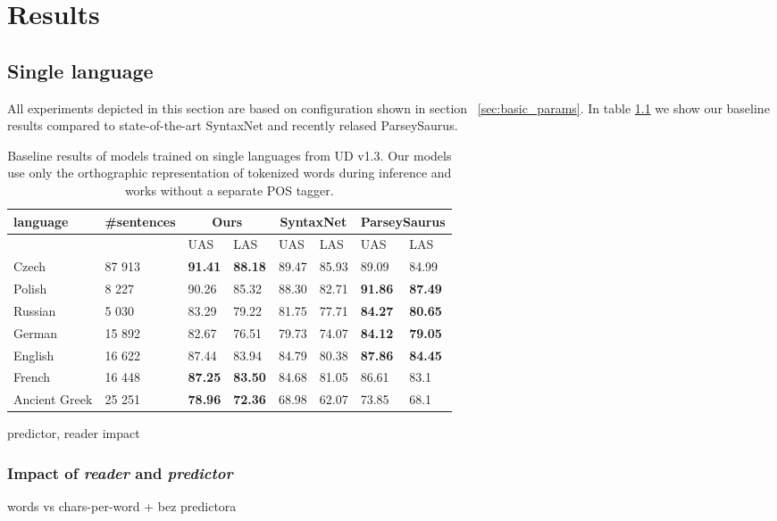 \chapter{Results}

\section{Single language}
All experiments depicted in this section are based on configuration shown in section
~\ref{sec:basic_params}. In table \ref{tab:universal} we show our baseline results
compared to state-of-the-art SyntaxNet\cite{andor_globally_2016}
and recently relased ParseySaurus\cite{alberti_parsey_saurus_2017}.

\begin{table}[!htbp]
  \centering
  \begin{tabular}{l l | l l | l l | l l}
    language & \#sentences & \multicolumn{2}{c|}{Ours} & \multicolumn{2}{c|}{SyntaxNet} & \multicolumn{2}{c}{ParseySaurus} \\ \hline
    & & UAS & LAS & UAS & LAS & UAS & LAS\\ \hline
    Czech & 87 913 & \textbf{91.41} & \textbf{88.18} & 89.47 & 85.93 & 89.09 & 84.99 \\
    Polish & 8 227 & 90.26 & 85.32 & 88.30 & 82.71 & \textbf{91.86} & \textbf{87.49}\\
    Russian & 5 030 & 83.29 & 79.22 & 81.75 & 77.71 & \textbf{84.27} & \textbf{80.65} \\
    German & 15 892 & 82.67 & 76.51 & 79.73 & 74.07 & \textbf{84.12} & \textbf{79.05}\\
    English & 16 622 & 87.44 & 83.94 & 84.79 & 80.38 & \textbf{87.86} & \textbf{84.45}\\ %
    French & 16 448 & \textbf{87.25} & \textbf{83.50} & 84.68 & 81.05 & 86.61 & 83.1\\
    Ancient Greek & 25 251 & \textbf{78.96} & \textbf{72.36} & 68.98 & 62.07 & 73.85 & 68.1
  \end{tabular}
  \caption{Baseline results of models trained on single languages from
    UD v1.3. Our models use only the orthographic representation of
    tokenized words during inference and works without a separate POS tagger.}
  \label{tab:universal}
\end{table}

predictor, reader impact

\subsection{Impact of \emph{reader} and \emph{predictor}}
words vs chars-per-word + bez predictora

